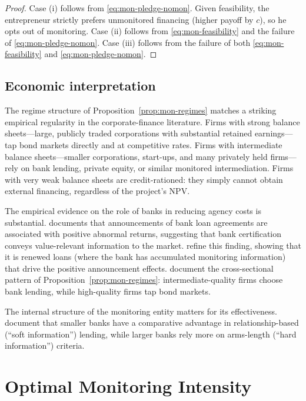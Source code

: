 \documentclass[11pt,a4paper,oneside]{book}
\theoremstyle{plain}
\theoremstyle{definition}
\theoremstyle{remark}
\numberwithin{equation}{chapter}
\begin{document}
\begin{proof}
Case (i) follows from \eqref{eq:mon-pledge-nomon}.
Given feasibility, the entrepreneur strictly prefers unmonitored financing (higher payoff by $c$), so he opts out of monitoring.
Case (ii) follows from \eqref{eq:mon-feasibility} and the failure of \eqref{eq:mon-pledge-nomon}.
Case (iii) follows from the failure of both \eqref{eq:mon-feasibility} and \eqref{eq:mon-pledge-nomon}.
\end{proof}

\subsection{Economic interpretation}

The regime structure of Proposition~\ref{prop:mon-regimes} matches a striking empirical regularity in the corporate-finance literature.
Firms with strong balance sheets---large, publicly traded corporations with substantial retained earnings---tap bond markets directly and at competitive rates.
Firms with intermediate balance sheets---smaller corporations, start-ups, and many privately held firms---rely on bank lending, private equity, or similar monitored intermediation.
Firms with very weak balance sheets are credit-rationed: they simply cannot obtain external financing, regardless of the project's NPV.

The empirical evidence on the role of banks in reducing agency costs is substantial.
\citet{James1987} documents that announcements of bank loan agreements are associated with positive abnormal returns, suggesting that bank certification conveys value-relevant information to the market.
\citet{LummerMcConnell1989} refine this finding, showing that it is renewed loans (where the bank has accumulated monitoring information) that drive the positive announcement effects.
\citet{CantilloWright2000} document the cross-sectional pattern of Proposition~\ref{prop:mon-regimes}: intermediate-quality firms choose bank lending, while high-quality firms tap bond markets.

The internal structure of the monitoring entity matters for its effectiveness.
\citet{BergerMillerPetersenRajanStein2005} document that smaller banks have a comparative advantage in relationship-based (``soft information'') lending, while larger banks rely more on arms-length (``hard information'') criteria.

\section{Optimal Monitoring Intensity}
\label{sec:mon-optimal}
\end{document}
